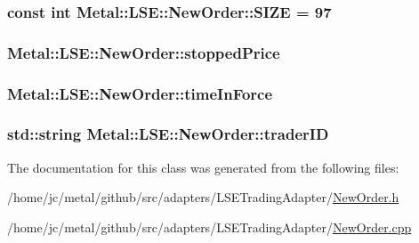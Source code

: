 \subsubsection[{S\+I\+Z\+E}]{\setlength{\rightskip}{0pt plus 5cm}const int Metal\+::\+L\+S\+E\+::\+New\+Order\+::\+S\+I\+Z\+E = 97\hspace{0.3cm}{\ttfamily [static]}}\label{classMetal_1_1LSE_1_1NewOrder_a1b9c8980a62d9902914b215a139740ba}
\hypertarget{classMetal_1_1LSE_1_1NewOrder_abf0f20401650effe0dba393616128d0b}{}
\subsubsection[{stopped\+Price}]{ Metal\+::\+L\+S\+E\+::\+New\+Order\+::stopped\+Price}\label{classMetal_1_1LSE_1_1NewOrder_abf0f20401650effe0dba393616128d0b}
\hypertarget{classMetal_1_1LSE_1_1NewOrder_ab0da192ab665eeffa7797f901d2f94fc}{}
\subsubsection[{time\+In\+Force}]{ Metal\+::\+L\+S\+E\+::\+New\+Order\+::time\+In\+Force}\label{classMetal_1_1LSE_1_1NewOrder_ab0da192ab665eeffa7797f901d2f94fc}
\hypertarget{classMetal_1_1LSE_1_1NewOrder_aff72605e8542180dad099904873bda84}{}
\subsubsection[{trader\+I\+D}]{\setlength{\rightskip}{0pt plus 5cm}std\+::string Metal\+::\+L\+S\+E\+::\+New\+Order\+::trader\+I\+D}\label{classMetal_1_1LSE_1_1NewOrder_aff72605e8542180dad099904873bda84}


The documentation for this class was generated from the following files\+:\begin{DoxyCompactItemize}
\item 
/home/jc/metal/github/src/adapters/\+L\+S\+E\+Trading\+Adapter/\hyperlink{NewOrder_8h}{New\+Order.\+h}\item 
/home/jc/metal/github/src/adapters/\+L\+S\+E\+Trading\+Adapter/\hyperlink{NewOrder_8cpp}{New\+Order.\+cpp}\end{DoxyCompactItemize}
